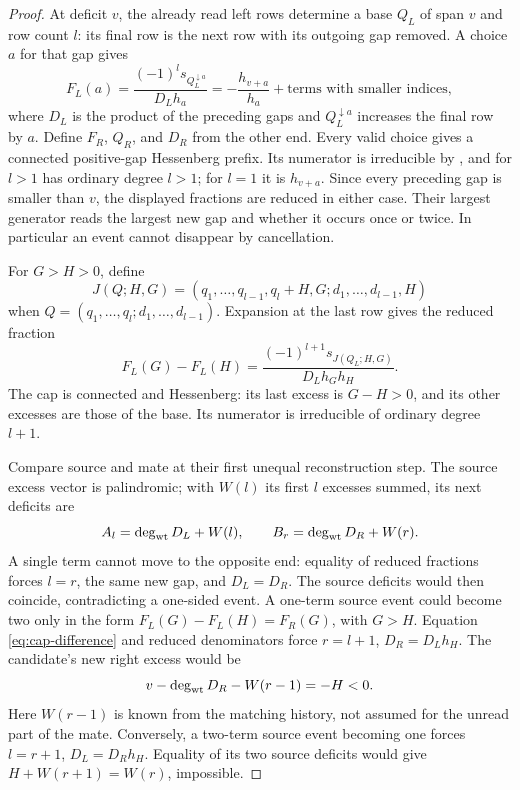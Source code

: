 \documentclass[11pt,a4paper]{amsart}
\numberwithin{equation}{section}
\theoremstyle{plain}
\theoremstyle{definition}
\begin{document}
\begin{proof}
At deficit \(v\), the already read left rows determine a base
\(Q_L\) of span \(v\) and row count \(l\): its final row
is the next row with its outgoing gap removed.  A choice \(a\)
for that gap gives
\[
 F_L(a)=\frac{(-1)^l s_{Q_L^{\downarrow a}}}{D_Lh_a}
       =-\frac{h_{v+a}}{h_a}+\text{terms with smaller indices},
\]
where \(D_L\) is the product of the preceding gaps and
\(Q_L^{\downarrow a}\) increases the final row by \(a\).
Define \(F_R\), \(Q_R\), and \(D_R\) from the other end.
Every valid choice gives a connected positive-gap Hessenberg prefix.
Its numerator is irreducible by
\cite{Barekat2009CoincidencesCorrigendum}, and for \(l>1\)
has ordinary degree \(l>1\); for \(l=1\) it is
\(h_{v+a}\).  Since every preceding gap is smaller than \(v\),
the displayed fractions are reduced in either case.  Their largest
generator reads the largest new gap and whether it occurs once or twice.
In particular an event cannot disappear by cancellation.

For \(G>H>0\), define
\[
 J(Q;H,G)=(q_1,\ldots,q_{l-1},q_l+H,G;
                         d_1,\ldots,d_{l-1},H)
\]
when \(Q=(q_1,\ldots,q_l;d_1,\ldots,d_{l-1})\).
Expansion at the last row gives the reduced fraction
\begin{equation}\label{eq:cap-difference}
 F_L(G)-F_L(H)
 =\frac{(-1)^{l+1}s_{J(Q_L;H,G)}}{D_Lh_Gh_H}.
\end{equation}
The cap is connected and Hessenberg: its last excess is \(G-H>0\),
and its other excesses are those of the base.  Its numerator is
irreducible of ordinary degree \(l+1\).

Compare source and mate at their first unequal reconstruction step.
The source excess vector is palindromic; with \(W(l)\) its first
\(l\) excesses summed, its next deficits are
\[
 A_l=\deg_{\rm wt}D_L+W(l),\qquad
 B_r=\deg_{\rm wt}D_R+W(r).
\]
A single term cannot move to the opposite end: equality of reduced
fractions forces \(l=r\), the same new gap, and \(D_L=D_R\).
The source deficits would then coincide, contradicting a one-sided event.
A one-term source event could become two only in the form
\(F_L(G)-F_L(H)=F_R(G)\), with \(G>H\).
Equation \eqref{eq:cap-difference} and reduced denominators force
\(r=l+1\), \(D_R=D_Lh_H\).  The candidate's new right
excess would be
\[
 v-\deg_{\rm wt}D_R-W(r-1)=-H<0.
\]
Here \(W(r-1)\) is known from the matching history, not assumed
for the unread part of the mate.  Conversely, a two-term source event
becoming one forces \(l=r+1\), \(D_L=D_Rh_H\).
Equality of its two source deficits would give
\(H+W(r+1)=W(r)\), impossible.


\end{proof}
\end{document}

